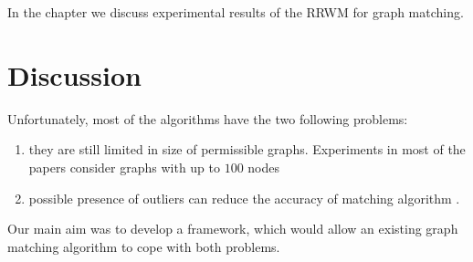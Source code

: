 In the chapter  we discuss experimental results of the RRWM for graph matching.

\section{Discussion}

Unfortunately, most of the algorithms have the two following problems:
\begin{enumerate}
\item they are still limited in size of permissible graphs. Experiments in most of the papers consider graphs with up to $100$ nodes \cite{Cho2014_Haystack, Cho2010_RRWM, Cho2012_ProgressiveGM}
\item possible presence of outliers can reduce the accuracy of matching algorithm \cite{Suh_CVPR2015}.
\end{enumerate}  

Our main aim was to develop a framework, which would allow an existing graph matching algorithm to cope with both problems.

